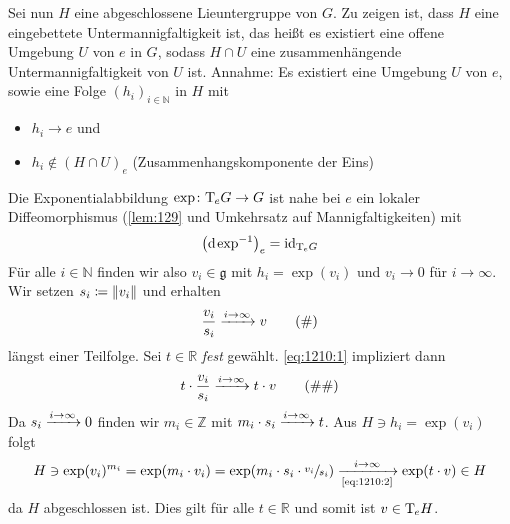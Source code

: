 \begin{beweis}
\begin{enumerate}[1)]
		Sei nun $H$ eine abgeschlossene Lieuntergruppe von $G$.
		Zu zeigen ist, dass $H$ eine eingebettete Untermannigfaltigkeit ist, das heißt es existiert eine offene Umgebung $U$ von $e$ in $G$, sodass $H \cap U$ eine zusammenhängende Untermannigfaltigkeit von $U$ ist. 
		Annahme: Es existiert eine Umgebung $U$ von $e$, sowie eine Folge $(h_i)_{i \in \mathbb{N}}$ in $H$ mit
		\begin{itemize}
			\item $h_i \to e$ und
			\item $h_i \notin (H \cap U)_e$ (Zusammenhangskomponente der Eins)
		\end{itemize}
		Die Exponentialabbildung $\exp \colon \Tmap_e G \to G$ ist nahe bei $e$ ein lokaler Diffeomorphismus (\autoref{lem:129} und Umkehrsatz auf Mannigfaltigkeiten) mit 
		\[
			\enbrace*{\mathd \exp^{-1}}_e = \id_{\Tmap_e G}
		\]
		Für alle $i \in \mathbb{N}$ finden wir also $v_i \in \mathfrak{g}$ mit $h_i = \exp(v_i)$ und $v_i \to 0$ für $i \to \infty$.
		Wir setzen $s_i \coloneqq \norm*{v_i}$ und erhalten
		\begin{equation}
			\frac{v_i}{s_i} \grenzw{i \to \infty} v \label{eq:1210:1} \tag{\#}
		\end{equation}
		längst einer Teilfolge.
		Sei $t \in \mathbb{R}$ \emph{fest} gewählt.
		\eqref{eq:1210:1} impliziert dann
		\begin{equation}
			t \cdot \frac{v_i}{s_i} \grenzw{i \to \infty} t \cdot v \label{eq:1210:2} \tag{\#\#}
		\end{equation}
		Da $s_i \grenzw{i \to \infty} 0$ finden wir $m_i \in \mathbb{Z}$ mit $m_i \cdot s_i \grenzw{i \to \infty} t$.
		Aus $H \ni h_i = \exp(v_i)$ folgt 
		\[
			H \ni \exp(v_i)^{m_i} = \exp \enbrace*{m_i \cdot v_i}  = \exp \enbrace*{m_i \cdot s_i \cdot \sfrac{v_i}{s_i}}  \xrightarrow[\text{\eqref{eq:1210:2}}]{i \to \infty} \exp(t \cdot v) \in H
		\]
		da $H$ abgeschlossen ist.
		Dies gilt für alle $t \in \mathbb{R}$ und somit ist $v \in \Tmap_e H$.

\end{enumerate}
\end{beweis}
